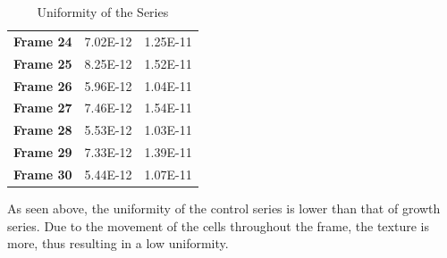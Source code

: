 \documentclass{article}
\begin{document}
\begin{table}[h!]
\begin{tabular}{ |p{3cm}||p{3cm}|p{3cm}|  }
\textbf{Frame 24} & 7.02E-12 & 1.25E-11\\
\textbf{Frame 25} & 8.25E-12 & 1.52E-11\\
\textbf{Frame 26} & 5.96E-12 & 1.04E-11\\
\textbf{Frame 27} & 7.46E-12 & 1.54E-11\\
\textbf{Frame 28} & 5.53E-12 & 1.03E-11\\
\textbf{Frame 29} & 7.33E-12 & 1.39E-11\\
\textbf{Frame 30} & 5.44E-12 & 1.07E-11\\
 \hline
    \end{tabular}
    \caption{Uniformity of the Series}
    \label{tab:Uniformity_Series}
\end{table}

As seen above, the uniformity of the control series is lower than that of growth series. Due to the movement of the cells throughout the frame, the texture is more, thus resulting in a low uniformity. 
\end{document}
